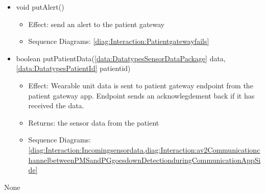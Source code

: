 \begin{description}
\begin{itemize}[noitemsep,nolistsep,leftmargin=-.25cm]
\begin{itemize}[noitemsep,nolistsep]
           \item Returns: connection succefull
           \item Sequence Diagrams: \cref{diag:Interaction:Ping}
        \end{itemize}
      \item \textsf{void putAlert()}
        \begin{itemize}[noitemsep,nolistsep]
           \item Effect: send an alert to the patient gateway 
           \item Sequence Diagrams: \cref{diag:Interaction:Patientgatewayfails}
        \end{itemize}
      \item \textsf{boolean putPatientData(\ref{data:DatatypesSensorDataPackage} data, \ref{data:DatatypesPatientId} patientid)}
        \begin{itemize}[noitemsep,nolistsep]
           \item Effect: Wearable unit data is sent to patient gateway endpoint from the patient gateway app. Endpoint sends an acknowlegdement back if it has received the data. 
           \item Returns: the sensor data from the patient
           \item Sequence Diagrams: \cref{diag:Interaction:Incomingsensordata,diag:Interaction:av2CommunicationchannelbetweenPMSandPGgoesdownDetectionduringCommunicationAppSide}
        \end{itemize}
    \end{itemize}
      \item[Diagrams:] None
    \end{description}

